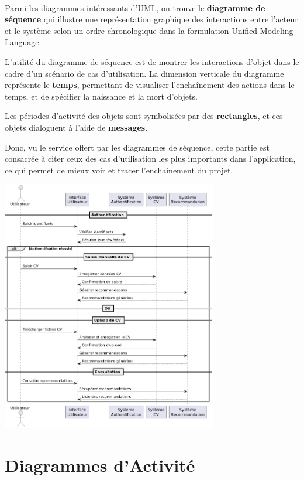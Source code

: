 \paragraph{}\begin{spacing}{1}
Parmi les diagrammes intéressants d’UML, on trouve le \textbf{diagramme de séquence} qui illustre une représentation graphique des interactions entre l’acteur et le système selon un ordre chronologique dans la formulation Unified Modeling Language.

L’utilité du diagramme de séquence est de montrer les interactions d’objet dans le cadre d’un scénario de cas d’utilisation. La dimension verticale du diagramme représente le \textbf{temps}, permettant de visualiser l'enchaînement des actions dans le temps, et de spécifier la naissance et la mort d'objets.

Les périodes d'activité des objets sont symbolisées par des \textbf{rectangles}, et ces objets dialoguent à l'aide de \textbf{messages}. 

Donc, vu le service offert par les diagrammes de séquence, cette partie est consacrée à citer ceux des cas d’utilisation les plus importants dans l’application, ce qui permet de mieux voir et tracer l’enchaînement du projet.
\end{spacing}
\includegraphics[width=\linewidth, height=11cm]{images/diagramme dequence.png}

\section{Diagrammes d’Activité}
